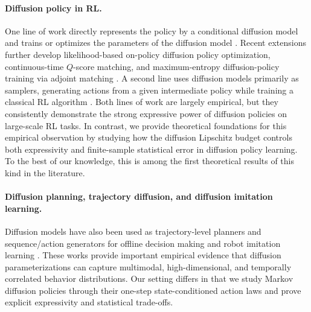 \documentclass{article}
\newcommand{\1}{\mathbbm{1}}
\numberwithin{equation}{section}
\begin{document}
\paragraph{Diffusion policy in RL.} One line of work directly represents the policy by a conditional diffusion
model and trains or optimizes the parameters of the diffusion model \cite{
 ding2024diffusion, fang2025diffusion,
ma2025efficient, psenka2024learning,ren2025diffusion,wang2024diffusion,wang2023diffusion, yang2023policy}. 
Recent extensions further develop likelihood-based on-policy diffusion policy optimization, continuous-time \(Q\)-score matching, and maximum-entropy diffusion-policy training via adjoint matching
\cite{ding2025genpo,hua2025continuous,thilges2026scalable}.
A second line uses diffusion models primarily as samplers, generating actions from a given intermediate policy while training a classical RL algorithm \cite{chen2024score,chen2023offline,chen2024diffusion,   hansen2023idql, lu2023contrastive,
mao2024diffusion}. 
Both lines of work are largely empirical, but they consistently demonstrate the strong expressive power of diffusion policies on large-scale RL tasks. In contrast, we provide theoretical foundations for this empirical observation by studying how the diffusion Lipschitz budget controls both expressivity and finite-sample statistical error in diffusion policy learning. To the best of our knowledge, this is among the first theoretical results of this kind in the literature. 




\paragraph{Diffusion planning, trajectory diffusion, and diffusion imitation learning.}
Diffusion models have also been used as trajectory-level planners and
sequence/action generators for offline decision making and robot imitation
learning
\cite{janner2022planning, ajay2023conditional, li2023hierarchical,
chi2025diffusion, ke20243d, scheikl2024movement,
huang2024diffuseloco, balim2025model}. These works provide important
empirical evidence that diffusion parameterizations can capture multimodal,
high-dimensional, and temporally correlated behavior distributions. Our setting
differs in that we study Markov diffusion policies through their one-step
state-conditioned action laws and prove explicit expressivity and statistical
trade-offs.
\end{document}
